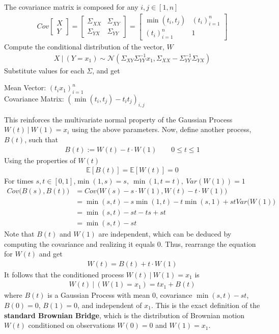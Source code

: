 \documentclass{article}
\newcommand{\NL}{\newline
\newline}
\newcommand{\EX}{\mathbb{E}}
\begin{document}
The covariance matrix is composed for any $i,j\in[1,n]$
\begin{align*}
    Cov\begin{bmatrix}
        X\\
        Y
    \end{bmatrix}=
    \begin{bmatrix}
        \Sigma_{XX}& \Sigma_{XY}\\
        \Sigma_{YX} & \Sigma_{YY}
    \end{bmatrix}   =
    \begin{bmatrix}
        \min(t_i,t_j)& (t_i)_{i=1}^n\\
        (t_i)_{i=1}^n & 1
    \end{bmatrix}
\end{align*}
Compute the conditional distribution of the vector, $W$
\begin{align*}
    X~\big|~(Y=x_1)\sim\mathcal{N}(\Sigma_{XY}\Sigma_{YY}^{-1}x_1,\Sigma_{XX}-\Sigma_{YY}^{-1}\Sigma_{YX})
\end{align*}
Substitute values for each $\Sigma$, and get
\begin{center}
    Mean Vector: $(t_ix_1)_{i=1}^n$\\
    Covariance Matrix: $(\min(t_i,t_j)-t_it_j)_{i,j}$\\
\end{center}
This reinforces the multivariate normal property of the Gaussian Process $W(t)~|~W(1)=x_i$ using the above parameters.
\NL
Now, define another process, $B(t)$, such that
\begin{align*}
    B(t):=W(t)-t\cdot W(1)\qquad 0\leq t\leq 1
\end{align*}
Using the properties of $W(t)$
\begin{align*}
    \EX[B(t)]=\EX[W(t)]=0
\end{align*}
For times $s,t\in [0,1]$,\quad  $\min(1,s)=s,~\min(1,t=t),~Var(W(1))=1$
\begin{align*}
    Cov\Big(B(s),B(t)\Big)&=Cov\Big(W(s)-s\cdot W(1),W(t)-t\cdot W(1)\Big)\\
    &=\min(s,t)-s \min(1,t)-t\min(s,1)+st Var\Big(W(1)\Big)\\
    &=\min(s,t)-st-ts+st\\
    &=\min(s,t)-st
\end{align*}
Note that $B(t)$ and $W(1)$ are independent, which can be deduced by computing the covariance and realizing it equals 0. Thus, rearrange the equation for $W(t)$ and get
\begin{align*}
    W(t)=B(t)+t\cdot W(1)
\end{align*}
It follows that the conditioned process $W(t)~|~W(1)=x_1$ is
\begin{align*}
    W(t)~|~(W(1)=x_1)=tx_1+B(t)
\end{align*}
where $B(t)$ is a Gaussian Process with mean $0$, covariance $\min(s,t)-st$, $B(0)=0$,  $B(1)=0$, and independent of $x_1$. This is the exact definition of the \textbf{standard Brownian Bridge}, which is the distribution of Brownian motion $W(t)$ conditioned on observations $W(0)=0$ and $W(1)=x_1$.
\end{document}

